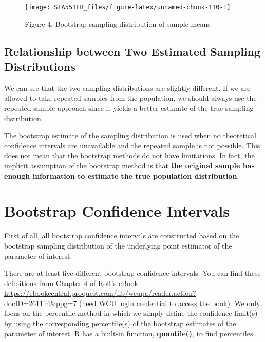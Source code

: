 \documentclass[
]{book}
\begin{document}
\begin{figure}

{\centering \texttt{[image: STA551EB\_files/figure-latex/unnamed-chunk-110-1]} 

}

\caption{Figure 4. Bootstrap sampling distribution of sample means}\label{fig:unnamed-chunk-110}
\end{figure}

\hypertarget{relationship-between-two-estimated-sampling-distributions}{%
\subsection{Relationship between Two Estimated Sampling Distributions}\label{relationship-between-two-estimated-sampling-distributions}}

We can see that the two sampling distributions are slightly different. If we are allowed to take repeated samples from the population, we should always use the repeated sample approach since it yields a better estimate of the true sampling distribution.

The bootstrap estimate of the sampling distribution is used when no theoretical confidence intervals are unavailable and the repeated sample is not possible. This does not mean that the bootstrap methods do not have limitations. In fact, the implicit assumption of the bootstrap method is that \textbf{the original sample has enough information to estimate the true population distribution}.

\hypertarget{bootstrap-confidence-intervals}{%
\section{Bootstrap Confidence Intervals}\label{bootstrap-confidence-intervals}}

First of all, all bootstrap confidence intervals are constructed based on the bootstrap sampling distribution of the underlying point estimator of the parameter of interest.

There are at least five different bootstrap confidence intervals. You can find these definitions from Chapter 4 of Roff's eBook \url{https://ebookcentral.proquest.com/lib/wcupa/reader.action?docID=261114\&ppg=7} (need WCU login credential to access the book). We only focus on the percentile method in which we simply define the confidence limit(s) by using the corresponding percentile(s) of the bootstrap estimates of the parameter of interest. R has a built-in function, \textbf{quantile()}, to find percentiles.
\end{document}
